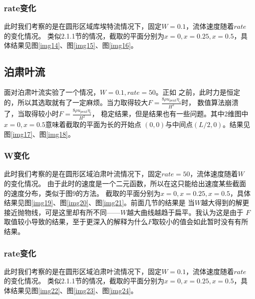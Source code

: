 \documentclass[11pt,UTF8]{ctexart}
\begin{document}
    \subsubsection{rate变化}
    \par{此时我们考察的是在圆形区域库埃特流情况下，固定$W=0.1$，流体速度随着$rate$的变化情况。
    类似2.1.1节的情况，截取的平面分别为$x=0,x=0.25,x=0.5$，具体结果见图\ref {img14}、图\ref {img15}、图\ref {img16}。}
    \subsection{泊肃叶流}
    \par{面对泊肃叶流实验了一个情况，$W=0.1,rate=50$。正如
    之前，此时力是恒定的，所以其选取就有了一定麻烦。当力取得较大$F=\frac{8\rho u_{peak} \eta_s}{H^2}$时，
    数值算法崩溃了，当取得较小时$F=\frac{8\rho u_{peak} \eta_l}{H^2}$，
    稳定结果，但是结果也有一些问题。其中2维图中$x=0,x=0.5$意味着截取的平面为长的开始点
    $(0,0)$与中间点$(L/2,0)$。结果见图\ref {img17}、图\ref {img18}。}
    \subsubsection{W变化}
    \par{此时我们考察的是在圆形区域泊肃叶流情况下，固定$rate=50$，流体速度随着$W$的变化情况。
    由于此时的速度是一个二元函数，所以在这只能给出速度某些截面的速度分布，类似于图9的方法。
    截取的平面分别为$x=0,x=0.25,x=0.5$，具体结果见图\ref {img19}、图\ref {img20}、图\ref {img21}。前面几节的结果是
    当$W$越大得到的解更接近抛物线，可是这里却有所不同——$W$越大曲线越趋于扁平。我认为这是由于
    $F$取值较小导致的结果，至于更深入的解释为什么$F$取较小的值会如此暂时没有有所结果。}
    \subsubsection{rate变化}
    \par{此时我们考察的是在圆形区域泊肃叶流情况下，固定$W=0.1$，流体速度随着$rate$的变化情况。
    类似2.1.1节的情况，截取的平面分别为$x=0,x=0.25,x=0.5$，具体结果见图\ref {img22}、图\ref {img23}、图\ref {img24}。}
\end{document}
